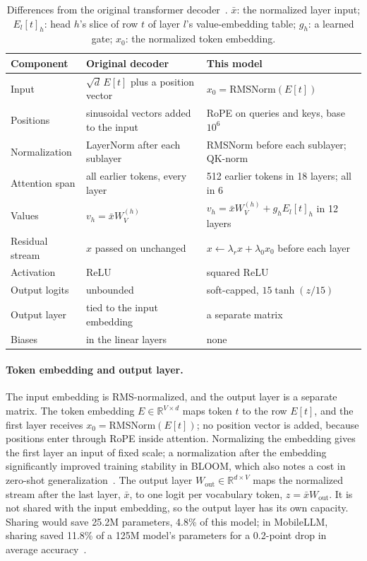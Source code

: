 \documentclass[sigconf,nonacm,balance=false]{acmart}
\providecommand{\arraybackslash}{\let\\\tabularnewline}
\begin{document}
\begin{table}
  \caption{Differences from the original transformer decoder~\cite{vaswani2017attention}. $\bar{x}$: the normalized
  layer input; $E_l[t]_h$: head $h$'s slice of row $t$ of layer $l$'s value-embedding table; $g_h$: a learned gate;
  $x_0$: the normalized token embedding.}
  \label{tab:diff}
  \footnotesize
  \setlength{\tabcolsep}{3pt}
  \begin{tabular}{>{\raggedright\arraybackslash}p{1.8cm}>{\raggedright\arraybackslash}p{2.5cm}%
    >{\raggedright\arraybackslash}p{3.4cm}}
    \toprule
    Component & Original decoder & This model \\
    \midrule
    Input & $\sqrt{d}\, E[t]$ plus a position vector & $x_0 = \mathrm{RMSNorm}(E[t])$ \\
    Positions & sinusoidal vectors added to the input & RoPE on queries and keys, base $10^6$ \\
    Normalization & LayerNorm after each sublayer & RMSNorm before each sublayer; QK-norm \\
    Attention span & all earlier tokens, every layer & 512 earlier tokens in 18 layers; all in 6 \\
    Values & $v_h = \bar{x} W_V^{(h)}$ & $v_h = \bar{x} W_V^{(h)} + g_h E_l[t]_h$ in 12 layers \\
    Residual stream & $x$ passed on unchanged & $x \leftarrow \lambda_r x + \lambda_0 x_0$ before each layer \\
    Activation & ReLU & squared ReLU \\
    Output logits & unbounded & soft-capped, $15 \tanh(z / 15)$ \\
    Output layer & tied to the input embedding & a separate matrix \\
    Biases & in the linear layers & none \\
    \bottomrule
  \end{tabular}
\end{table}

\paragraph{Token embedding and output layer.} The input embedding is RMS-normalized, and the output layer is a separate
matrix. The token embedding $E \in \mathbb{R}^{V \times d}$ maps token $t$ to the row $E[t]$, and the first layer
receives $x_0 = \mathrm{RMSNorm}(E[t])$; no position vector is added, because positions enter through RoPE inside
attention. Normalizing the embedding gives the first layer an input of fixed scale; a normalization after the embedding
significantly improved training stability in BLOOM, which also notes a cost in zero-shot
generalization~\cite{bigscience2022bloom}. The output layer $W_{\mathrm{out}} \in \mathbb{R}^{d \times V}$ maps the
normalized stream after the last layer, $\bar{x}$, to one logit per vocabulary token, $z = \bar{x} W_{\mathrm{out}}$.
It is not shared with the input embedding, so the output layer has its own capacity. Sharing would save 25.2M
parameters, 4.8\% of this model; in MobileLLM, sharing saved 11.8\% of a 125M model's parameters for a 0.2-point drop
in average accuracy~\cite{liu2024mobilellm}.
\end{document}
